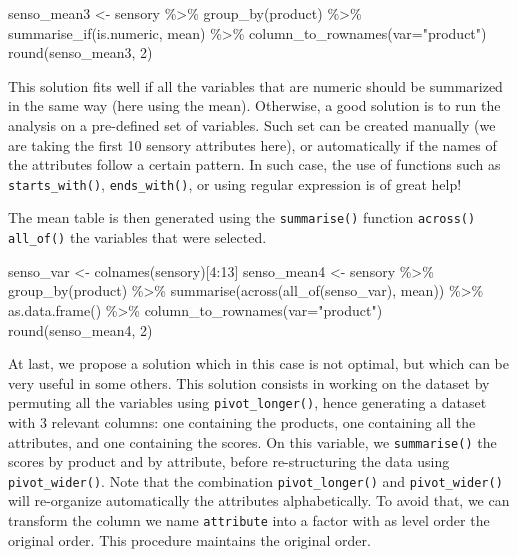 \documentclass[
]{book}
\newenvironment{Shaded}{\begin{snugshade}}{\end{snugshade}}
\newcommand{\AttributeTok}[1]{\textcolor[rgb]{0.77,0.63,0.00}{#1}}
\newcommand{\DecValTok}[1]{\textcolor[rgb]{0.00,0.00,0.81}{#1}}
\newcommand{\FunctionTok}[1]{\textcolor[rgb]{0.00,0.00,0.00}{#1}}
\newcommand{\NormalTok}[1]{#1}
\newcommand{\OtherTok}[1]{\textcolor[rgb]{0.56,0.35,0.01}{#1}}
\newcommand{\SpecialCharTok}[1]{\textcolor[rgb]{0.00,0.00,0.00}{#1}}
\newcommand{\StringTok}[1]{\textcolor[rgb]{0.31,0.60,0.02}{#1}}
\begin{document}
\begin{Shaded}
\begin{Highlighting}[]
\NormalTok{senso\_mean3 }\OtherTok{\textless{}{-}}\NormalTok{ sensory }\SpecialCharTok{\%\textgreater{}\%} 
  \FunctionTok{group\_by}\NormalTok{(product) }\SpecialCharTok{\%\textgreater{}\%} 
  \FunctionTok{summarise\_if}\NormalTok{(is.numeric, mean) }\SpecialCharTok{\%\textgreater{}\%} 
  \FunctionTok{column\_to\_rownames}\NormalTok{(}\AttributeTok{var=}\StringTok{"product"}\NormalTok{)}
\FunctionTok{round}\NormalTok{(senso\_mean3, }\DecValTok{2}\NormalTok{)}
\end{Highlighting}
\end{Shaded}

This solution fits well if all the variables that are numeric should be summarized in the same way (here using the mean). Otherwise, a good solution is to run the analysis on a pre-defined set of variables. Such set can be created manually (we are taking the first 10 sensory attributes here), or automatically if the names of the attributes follow a certain pattern. In such case, the use of functions such as \texttt{starts\_with()}, \texttt{ends\_with()}, or using regular expression is of great help!

The mean table is then generated using the \texttt{summarise()} function \texttt{across()} \texttt{all\_of()} the variables that were selected.

\begin{Shaded}
\begin{Highlighting}[]
\NormalTok{senso\_var }\OtherTok{\textless{}{-}} \FunctionTok{colnames}\NormalTok{(sensory)[}\DecValTok{4}\SpecialCharTok{:}\DecValTok{13}\NormalTok{]}
\NormalTok{senso\_mean4 }\OtherTok{\textless{}{-}}\NormalTok{ sensory }\SpecialCharTok{\%\textgreater{}\%} 
  \FunctionTok{group\_by}\NormalTok{(product) }\SpecialCharTok{\%\textgreater{}\%} 
  \FunctionTok{summarise}\NormalTok{(}\FunctionTok{across}\NormalTok{(}\FunctionTok{all\_of}\NormalTok{(senso\_var), mean)) }\SpecialCharTok{\%\textgreater{}\%} 
  \FunctionTok{as.data.frame}\NormalTok{() }\SpecialCharTok{\%\textgreater{}\%} 
  \FunctionTok{column\_to\_rownames}\NormalTok{(}\AttributeTok{var=}\StringTok{"product"}\NormalTok{)}
\FunctionTok{round}\NormalTok{(senso\_mean4, }\DecValTok{2}\NormalTok{)}
\end{Highlighting}
\end{Shaded}

At last, we propose a solution which in this case is not optimal, but which can be very useful in some others. This solution consists in working on the dataset by permuting all the variables using \texttt{pivot\_longer()}, hence generating a dataset with 3 relevant columns: one containing the products, one containing all the attributes, and one containing the scores. On this variable, we \texttt{summarise()} the scores by product and by attribute, before re-structuring the data using \texttt{pivot\_wider()}.
Note that the combination \texttt{pivot\_longer()} and \texttt{pivot\_wider()} will re-organize automatically the attributes alphabetically. To avoid that, we can transform the column we name \texttt{attribute} into a factor with as level order the original order. This procedure maintains the original order.
\end{document}
